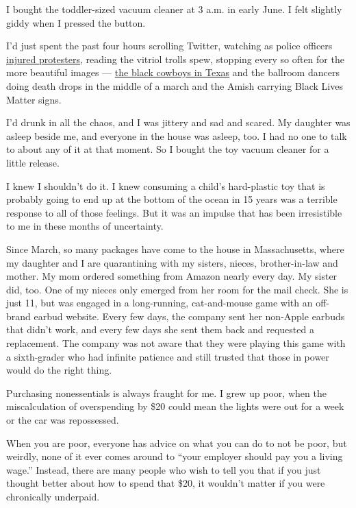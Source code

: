 I bought the toddler-sized vacuum cleaner at 3 a.m. in early June. I
felt slightly giddy when I pressed the button.

I'd just spent the past four hours scrolling Twitter, watching as police
officers
\href{https://www.nytimes3xbfgragh.onion/2020/06/05/us/police-violence-george-floyd.html}{injured
protesters}, reading the vitriol trolls spew, stopping every so often
for the more beautiful images ---
\href{https://www.newsweek.com/black-texas-cowboys-horseback-protest-george-floyds-death-viral-video-1508378}{the
black cowboys in Texas} and the ballroom dancers doing death drops in
the middle of a march and the Amish carrying Black Lives Matter signs.

I'd drunk in all the chaos, and I was jittery and sad and scared. My
daughter was asleep beside me, and everyone in the house was asleep,
too. I had no one to talk to about any of it at that moment. So I bought
the toy vacuum cleaner for a little release.

I knew I shouldn't do it. I knew consuming a child's hard-plastic toy
that is probably going to end up at the bottom of the ocean in 15 years
was a terrible response to all of those feelings. But it was an impulse
that has been irresistible to me in these months of uncertainty.

Since March, so many packages have come to the house in Massachusetts,
where my daughter and I are quarantining with my sisters, nieces,
brother-in-law and mother. My mom ordered something from Amazon nearly
every day. My sister did, too. One of my nieces only emerged from her
room for the mail check. She is just 11, but was engaged in a
long-running, cat-and-mouse game with an off-brand earbud website. Every
few days, the company sent her non-Apple earbuds that didn't work, and
every few days she sent them back and requested a replacement. The
company was not aware that they were playing this game with a
sixth-grader who had infinite patience and still trusted that those in
power would do the right thing.

Purchasing nonessentials is always fraught for me. I grew up poor, when
the miscalculation of overspending by \$20 could mean the lights were
out for a week or the car was repossessed.

When you are poor, everyone has advice on what you can do to not be
poor, but weirdly, none of it ever comes around to ``your employer
should pay you a living wage.'' Instead, there are many people who wish
to tell you that if you just thought better about how to spend that
\$20, it wouldn't matter if you were chronically underpaid.

